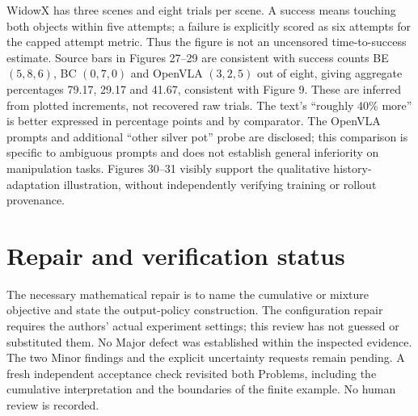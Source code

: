 \documentclass[10pt]{article}
\begin{document}
WidowX has three scenes and eight trials per scene. A success means touching both objects within five attempts; a failure is explicitly scored as six attempts for the capped attempt metric. Thus the figure is not an uncensored time-to-success estimate. Source bars in Figures 27–29 are consistent with success counts BE \((5,8,6)\), BC \((0,7,0)\) and OpenVLA \((3,2,5)\) out of eight, giving aggregate percentages 79.17, 29.17 and 41.67, consistent with Figure 9. These are inferred from plotted increments, not recovered raw trials. The text’s “roughly 40\% more” is better expressed in percentage points and by comparator. The OpenVLA prompts and additional “other silver pot” probe are disclosed; this comparison is specific to ambiguous prompts and does not establish general inferiority on manipulation tasks. Figures 30–31 visibly support the qualitative history-adaptation illustration, without independently verifying training or rollout provenance.\par
\section*{Repair and verification status}
The necessary mathematical repair is to name the cumulative or mixture objective and state the output-policy construction. The configuration repair requires the authors’ actual experiment settings; this review has not guessed or substituted them. No Major defect was established within the inspected evidence. The two Minor findings and the explicit uncertainty requests remain pending. A fresh independent acceptance check revisited both Problems, including the cumulative interpretation and the boundaries of the finite example. No human review is recorded.\par
\end{document}

